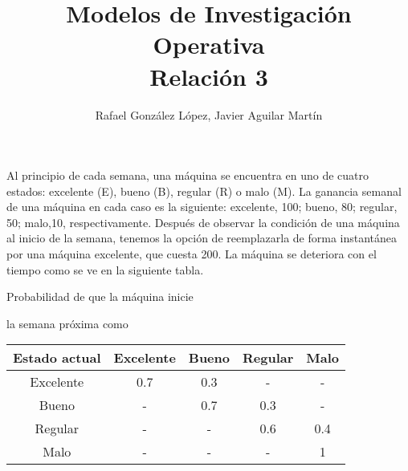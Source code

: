 \documentclass[twoside]{article}
\begin{document}
\title{Modelos de Investigación Operativa\\ Relación 3}
\author{Rafael González López, Javier Aguilar Martín}
\date{}
\maketitle

\begin{ejercicio}{1}
Al principio de cada semana, una máquina se encuentra en uno de cuatro estados: excelente (E), bueno (B), regular (R) o malo (M). La ganancia semanal de una máquina en cada caso es la siguiente: excelente, 100; bueno, 80; regular, 50; malo,10, respectivamente. Después de observar la condición de una máquina al inicio de la semana, tenemos la opción de reemplazarla de forma instantánea por una máquina excelente, que cuesta 200. La máquina se deteriora con el tiempo como se ve en la siguiente tabla.

\hskip2.7cm Probabilidad de que la máquina inicie

\hskip3.7cm la semana próxima como

\begin{tabular}{ccccc}
\hline
Estado actual & Excelente & Bueno & Regular & Malo\\
\hline
Excelente & 0.7 & 0.3 & - & -\\
Bueno &      -  & 0.7 & 0.3 & -\\
Regular & - & - & 0.6 & 0.4\\
Malo & - & - & - & 1
\end{tabular}


\end{ejercicio}
\end{document}
